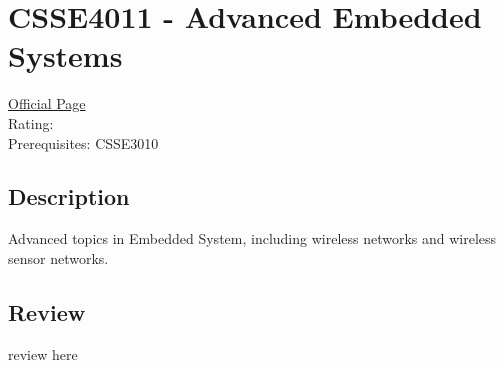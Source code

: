 \hypertarget{CSSE4011}{\section{CSSE4011 - Advanced Embedded Systems}}

\large
\textcolor{turbo_purple}{\href{https://my.uq.edu.au/programs-courses/course.html?course_code=CSSE4011}{Official Page}} \\
Rating: \cstar\cstar\cstar\cstar\ostar \\
Prerequisites: CSSE3010

\normalsize
\subsection*{Description}
Advanced topics in Embedded System, including wireless networks and wireless sensor networks.

\subsection*{Review}
review here
